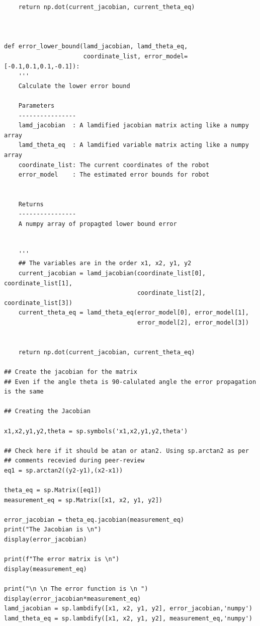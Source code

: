 {\begin{itemize}
\begin{verbatim}
    return np.dot(current_jacobian, current_theta_eq)
    


def error_lower_bound(lamd_jacobian, lamd_theta_eq, 
                      coordinate_list, error_model=[-0.1,0.1,0.1,-0.1]):
    '''
    Calculate the lower error bound
    
    Parameters
    ----------------
    lamd_jacobian  : A lamdified jacobian matrix acting like a numpy array
    lamd_theta_eq  : A lamdified variable matrix acting like a numpy array
    coordinate_list: The current coordinates of the robot
    error_model    : The estimated error bounds for robot
    
    
    Returns
    ----------------
    A numpy array of propagted lower bound error
    
    
    '''
    ## The variables are in the order x1, x2, y1, y2
    current_jacobian = lamd_jacobian(coordinate_list[0], coordinate_list[1],
                                     coordinate_list[2], coordinate_list[3])
    current_theta_eq = lamd_theta_eq(error_model[0], error_model[1],
                                     error_model[2], error_model[3])
   

    return np.dot(current_jacobian, current_theta_eq)
    
## Create the jacobian for the matrix
## Even if the angle theta is 90-calulated angle the error propagation is the same 

## Creating the Jacobian

x1,x2,y1,y2,theta = sp.symbols('x1,x2,y1,y2,theta')

## Check here if it should be atan or atan2. Using sp.arctan2 as per
## comments recevied during peer-review
eq1 = sp.arctan2((y2-y1),(x2-x1))

theta_eq = sp.Matrix([eq1])
measurement_eq = sp.Matrix([x1, x2, y1, y2])

error_jacobian = theta_eq.jacobian(measurement_eq)
print("The Jacobian is \n")
display(error_jacobian)

print(f"The error matrix is \n")
display(measurement_eq)

print("\n \n The error function is \n ")
display(error_jacobian*measurement_eq)
lamd_jacobian = sp.lambdify([x1, x2, y1, y2], error_jacobian,'numpy')
lamd_theta_eq = sp.lambdify([x1, x2, y1, y2], measurement_eq,'numpy')


\end{verbatim}
\end{itemize}}
